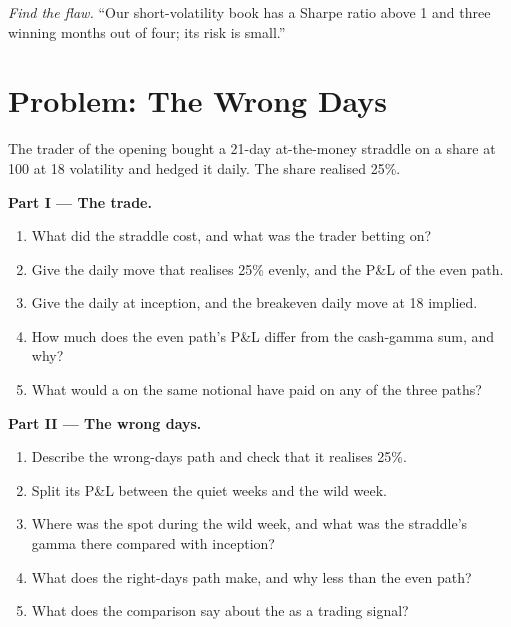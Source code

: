 \begin{exercise}[$\star\star\star$]\label{exo:dv:trading-volatility:8}
\emph{Find the flaw.} ``Our short-volatility book has a Sharpe ratio above 1 and three winning months out of four; its risk is small.''
\end{exercise}

\section{Problem: The Wrong Days}

\begin{problem}\label{pb:dv:trading-volatility:1}
The trader of the opening bought a 21-day at-the-money straddle on a share at 100 at 18 volatility and hedged it daily. The share realised 25\%.

\medskip\noindent\textbf{Part I --- The trade.}
\begin{enumerate}
\item What did the straddle cost, and what was the trader betting on?
\item Give the daily move that realises 25\% evenly, and the P\&L of the even path.
\item Give the daily  at inception, and the breakeven daily move at 18 implied.
\item How much does the even path's P\&L differ from the cash-gamma sum, and why?
\item What would a  on the same notional have paid on any of the three paths?
\end{enumerate}

\medskip\noindent\textbf{Part II --- The wrong days.}
\begin{enumerate}[resume]
\item Describe the wrong-days path and check that it realises 25\%.
\item Split its P\&L between the quiet weeks and the wild week.
\item Where was the spot during the wild week, and what was the straddle's gamma there compared with inception?
\item What does the right-days path make, and why less than the even path?
\item What does the comparison say about the  as a trading signal?
\end{enumerate}


\end{problem}
